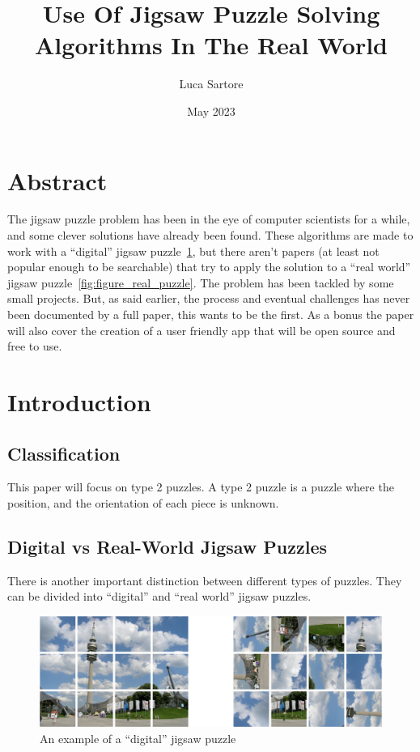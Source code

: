 \documentclass{article}
\title{Use Of Jigsaw Puzzle Solving Algorithms In The Real World}
\author{Luca Sartore}
\date{May 2023}
\begin{document}
\maketitle

\newpage

{
  \hypersetup{linkcolor=black}
  \tableofcontents
}

\newpage

\section{Abstract}
The jigsaw puzzle problem has been in the eye of computer scientists for a while,
and some clever solutions have already been found. These algorithms are made to
work with a “digital” jigsaw puzzle~\ref{fig:figure_digital_puzzle},
but there aren't papers (at least not popular enough to be searchable)
that try to apply the solution
to a “real world” jigsaw puzzle~\ref{fig:figure_real_puzzle}.\newline
The problem has been tackled by some small projects. But, as said earlier,
the process and eventual challenges has never been documented by a full paper,
this wants to be the first.\newline
As a bonus the paper will also cover the creation of a user friendly app
that will be open source and free to use.

\section{Introduction}
\subsection{Classification}
This paper will focus on type 2 puzzles. A type 2 puzzle is a puzzle where the position, and the orientation of each piece is unknown. 
\subsection{Digital vs Real-World Jigsaw Puzzles}

There is  another important distinction between different types of puzzles. They can be divided into “digital” and “real world” jigsaw puzzles.


\begin{figure}[h]
    \caption{An example of a “digital” jigsaw  puzzle}\label{fig:figure_digital_puzzle}
    \centering
    \includegraphics[height=0.25\textwidth]{pictures/digital_puzzle.png}
\end{figure}
\end{document}
